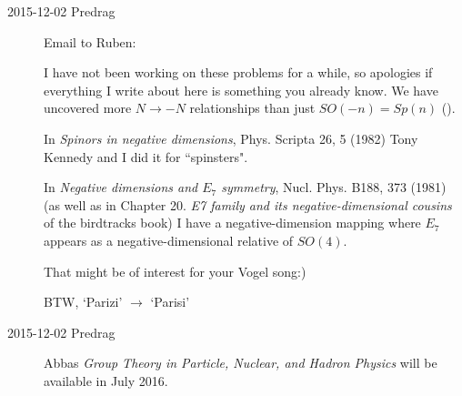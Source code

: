 \begin{description}
\item[2015-12-02  Predrag]
Email to Ruben:

I have not been working on these problems for a while, so apologies if
everything I write about here is something you already know. We have
uncovered more $N \to -N$ relationships than just $SO(-n)=Sp(n)$
().

In {\em Spinors in negative dimensions},
Phys. Scripta 26, 5 (1982) Tony Kennedy and I did it for ``spinsters".

In {\em Negative dimensions and $E_7$ symmetry}, Nucl. Phys. B188, 373
(1981) (as well as in Chapter 20. {\em E7 family and its
negative-dimensional cousins} of the birdtracks book) I have a
negative-dimension mapping where $E_7$  appears as a
negative-dimensional relative of $SO(4)$.

That might be of interest for your Vogel song:)

BTW, `Parizi' $\to$ `Parisi'


\item[2015-12-02  Predrag] Abbas {\em Group Theory
in Particle, Nuclear, and Hadron Physics} will be available in July 2016.

\end{description}
\renewcommand{\ssp}{a}

